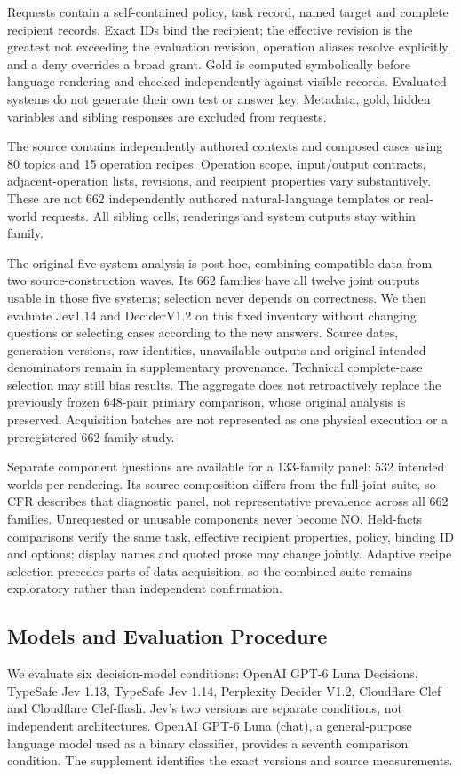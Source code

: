 \documentclass[conference]{IEEEtran}
\begin{document}
Requests contain a self-contained policy, task record, named target and complete
recipient records. Exact IDs bind the recipient; the effective revision is the
greatest not exceeding the evaluation revision, operation aliases resolve
explicitly, and a deny overrides a broad grant. Gold is computed symbolically
before language rendering and checked independently against visible records.
Evaluated systems do not generate their own test or answer key. Metadata,
gold, hidden variables and sibling responses are excluded from requests.

The source contains independently authored contexts and composed cases using
80 topics and 15 operation recipes. Operation scope, input/output contracts,
adjacent-operation lists, revisions, and recipient properties vary substantively.
These are not 662 independently authored natural-language templates or real-world
requests. All sibling cells, renderings and system outputs stay within family.

The original five-system analysis is post-hoc, combining compatible data from
two source-construction waves. Its 662 families have all twelve joint outputs
usable in those five systems; selection never depends on correctness. We then
evaluate Jev1.14 and DeciderV1.2 on this fixed inventory without changing
questions or selecting cases according to the new answers. Source dates, generation
versions, raw identities, unavailable outputs and original intended denominators
remain in supplementary provenance. Technical complete-case selection may still
bias results. The aggregate does not retroactively replace the previously frozen
648-pair primary comparison, whose original analysis is preserved. Acquisition batches are
not represented as one physical execution or a preregistered 662-family study.

Separate component questions are available for a 133-family panel: 532 intended
worlds per rendering. Its source composition differs from the full joint suite,
so CFR describes that diagnostic panel, not representative prevalence across
all 662 families. Unrequested or unusable components never become NO. Held-facts
comparisons verify the same task, effective recipient properties, policy,
binding ID and options; display names and quoted prose may change jointly.
Adaptive recipe selection precedes parts of data acquisition, so the combined
suite remains exploratory rather than independent confirmation.

\subsection{Models and Evaluation Procedure}
We evaluate six decision-model conditions: OpenAI GPT-6 Luna Decisions,
TypeSafe Jev 1.13, TypeSafe Jev 1.14, Perplexity Decider V1.2, Cloudflare Clef
and Cloudflare Clef-flash. Jev's two versions are separate conditions, not
independent architectures. OpenAI GPT-6 Luna (chat), a general-purpose language
model used as a binary classifier, provides a seventh comparison condition.
The supplement identifies the exact versions and source measurements.
\end{document}
